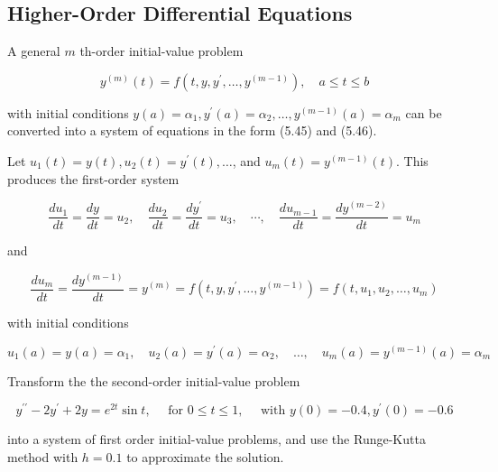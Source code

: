 \subsection*{Higher-Order Differential Equations}

A general $m$ th-order initial-value problem

$$
y^{(m)}(t)=f\left(t, y, y^{\prime}, \ldots, y^{(m-1)}\right), \quad a \leq t \leq b
$$

with initial conditions $y(a)=\alpha_{1}, y^{\prime}(a)=\alpha_{2}, \ldots, y^{(m-1)}(a)=\alpha_{m}$ can be converted into a system of equations in the form (5.45) and (5.46).

Let $u_{1}(t)=y(t), u_{2}(t)=y^{\prime}(t), \ldots$, and $u_{m}(t)=y^{(m-1)}(t)$. This produces the first-order system

$$
\frac{d u_{1}}{d t}=\frac{d y}{d t}=u_{2}, \quad \frac{d u_{2}}{d t}=\frac{d y^{\prime}}{d t}=u_{3}, \quad \cdots, \quad \frac{d u_{m-1}}{d t}=\frac{d y^{(m-2)}}{d t}=u_{m}
$$

and

$$
\frac{d u_{m}}{d t}=\frac{d y^{(m-1)}}{d t}=y^{(m)}=f\left(t, y, y^{\prime}, \ldots, y^{(m-1)}\right)=f\left(t, u_{1}, u_{2}, \ldots, u_{m}\right)
$$

with initial conditions

$$
u_{1}(a)=y(a)=\alpha_{1}, \quad u_{2}(a)=y^{\prime}(a)=\alpha_{2}, \quad \ldots, \quad u_{m}(a)=y^{(m-1)}(a)=\alpha_{m}
$$

\begin{example}
Transform the the second-order initial-value problem

$$
y^{\prime \prime}-2 y^{\prime}+2 y=e^{2 t} \sin t, \quad \text { for } 0 \leq t \leq 1, \quad \text { with } y(0)=-0.4, y^{\prime}(0)=-0.6
$$

into a system of first order initial-value problems, and use the Runge-Kutta method with $h=0.1$ to approximate the solution.
\end{example}

